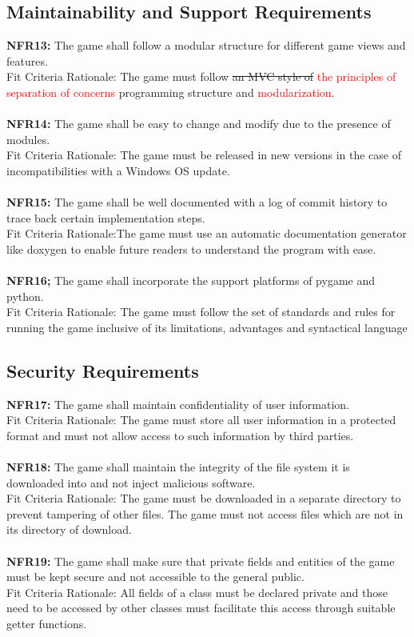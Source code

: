 \documentclass[12pt, titlepage]{article}
\begin{document}
\subsection{Maintainability and Support Requirements}

\textbf{NFR13:} The game shall follow a modular structure for different game views and features.\\
Fit Criteria Rationale: The game must follow \st{an MVC style of} \textcolor{red}{the principles of separation of concerns} programming structure and \textcolor{red}{modularization}.\\\\
\textbf{NFR14:} The game shall be easy to change and modify due to the presence of modules. \\
Fit Criteria Rationale: The game must be released in new versions in the case of incompatibilities with a Windows OS update.\\\\
\textbf{NFR15:} The game shall be well documented with a log of commit history to trace back certain implementation steps.\\
Fit Criteria Rationale:The game must use an automatic documentation generator like doxygen to enable future readers to understand the program with ease. \\\\
\textbf{NFR16;} The game shall incorporate the support platforms of pygame and python.\\
Fit Criteria Rationale: The game must follow the set of standards and rules for running the game inclusive of its limitations, advantages and syntactical language \\

\subsection{Security Requirements}
\textbf{NFR17:} The game shall maintain confidentiality of user information.\\
Fit Criteria Rationale: The game must store all user information in a protected format and must not allow access to such information by third parties.\\\\
\textbf{NFR18:} The game shall maintain the integrity of the file system it is downloaded into and not inject malicious software.\\
Fit Criteria Rationale: The game must be downloaded in a separate directory to prevent tampering of other files. The game must not access files which are not in its directory of download.\\\\
\textbf{NFR19:} The game shall make sure that private fields and entities of the game must be kept secure and not accessible to the general public.\\
Fit Criteria Rationale: All fields of a class must be declared private and those need to be accessed by other classes must facilitate this access through suitable getter functions.\\
\end{document}

